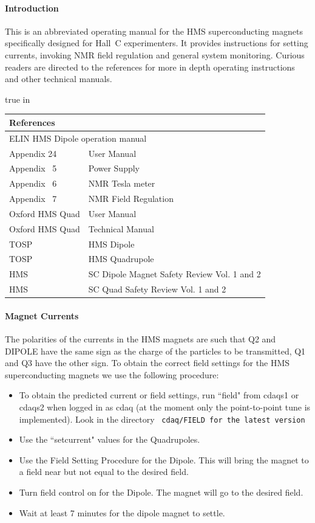 {\paragraph{Introduction}

This is an abbreviated operating manual for the HMS superconducting
magnets specifically designed for Hall~C experimenters. It provides
instructions for setting currents, invoking NMR field regulation and
general system monitoring.  Curious readers are directed to the
references for more in depth operating instructions and other technical
manuals.

 true in
\begin{center}
\begin{tabular}{ll}
\multicolumn{2}{l}{\bf References}\\
\hline
\multicolumn{2}{l}{ELIN HMS Dipole operation manual}\\
Appendix 24 &  User Manual \\
Appendix ~5 &  Power Supply \\
Appendix ~6 &  NMR Tesla meter \\
Appendix ~7 &  NMR Field Regulation \\
Oxford HMS Quad & User Manual \\
Oxford HMS Quad & Technical Manual \\
TOSP & HMS Dipole \\
TOSP & HMS Quadrupole \\
HMS & SC Dipole Magnet Safety Review Vol. 1 and 2 \\
HMS & SC Quad Safety Review Vol. 1 and 2 
\end{tabular}
\end{center}

\paragraph{Magnet Currents}

The polarities of the currents in the HMS magnets are such that
Q2 and DIPOLE have the same sign as the charge of the particles
to be transmitted, Q1 and Q3 have the other sign.
To obtain the correct field settings for the HMS superconducting magnets
we use the following procedure:

\begin{itemize}
\item{To obtain the predicted current or field settings, run ``field" from
cdaqs1 or cdaqs2 when logged in as cdaq (at the moment
only the point-to-point tune is implemented). Look in the directory 
{\tt ~cdaq/FIELD for the latest version}}
\item{Use the ``setcurrent" values for the Quadrupoles.}
\item{Use the Field Setting Procedure for the Dipole. This will bring the
magnet to a field near but not equal to the desired field.}
\item{Turn field control on for the Dipole. The magnet will go to the
desired field.}
\item{Wait at least 7 minutes for the dipole magnet to settle.}
\end{itemize}

}
